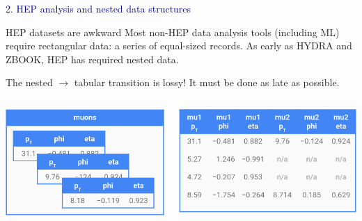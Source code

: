 \documentclass[aspectratio=169]{beamer}
\begin{document}
\begin{frame}{}
\LARGE
\vspace{1 cm}
\begin{center}
\textcolor{darkblue}{2. HEP analysis and nested data structures}
\end{center}
\end{frame}

\begin{frame}{HEP datasets are awkward}
\vspace{0.5 cm}
Most non-HEP data analysis tools (including ML) require rectangular data: a series of equal-sized records. As early as HYDRA and ZBOOK, HEP has required nested data.

\vspace{0.5 cm}
The nested $\to$ tabular transition is lossy! It must be done as late as possible.

\vspace{0.5 cm}
\begin{columns}
\includegraphics[width=\linewidth]{muons-as-objects.png}

\includegraphics[width=\linewidth]{muons-as-a-table.png}
\end{columns}
\end{frame}
\end{document}
